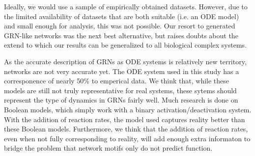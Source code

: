 \documentclass[../main.tex]{subfiles}
\begin{document}
Ideally, we would use a sample of empirically obtained datasets.
However, due to the limited availability of datasets that are both suitable (i.e. an ODE model) and small enough for analysis, this was not possible.
Our resort to generated GRN-like networks was the next best alternative, but raises doubts about the extend to which our results can be generalized to all biological complex systems.

As the accurate description of GRNs as ODE systems is relatively new territory, networks are not very accurate yet.
The ODE system used in this study has a corresponence of nearly 50\% to emperical data.
We think that, while these models are still not truly representative for real systems, these sytems should represent the type of dynamics in GRNs fairly well.
Much research is done on Boolean models, which simply work with a binary activation/deactivation system.
With the addition of reaction rates, the model used captures reality better than these Boolean models.
Furthermore, we think that the addition of reaction rates, even when not fully corresponding to reality, will add enough extra informaton to bridge the problem that network motifs only do not predict function.
\end{document}
